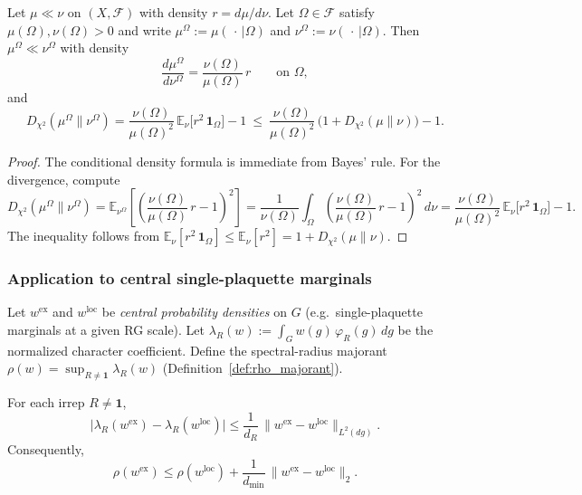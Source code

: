 \begin{lemma}\label{lem:chi2_conditioning}
Let $\mu\ll\nu$ on $(X,\mathcal F)$ with density $r=d\mu/d\nu$.
Let $\Omega\in\mathcal F$ satisfy $\mu(\Omega),\nu(\Omega)>0$ and write $\mu^{\Omega}:=\mu(\,\cdot\,|\Omega)$ and $\nu^{\Omega}:=\nu(\,\cdot\,|\Omega)$.
Then $\mu^{\Omega}\ll\nu^{\Omega}$ with density
\[
\frac{d\mu^{\Omega}}{d\nu^{\Omega}}
=
\frac{\nu(\Omega)}{\mu(\Omega)}\,r
\qquad\text{on }\Omega,
\]
and
\begin{equation}\label{eq:chi2_conditioning}
D_{\chi^2}(\mu^{\Omega}\|\nu^{\Omega})
=
\frac{\nu(\Omega)}{\mu(\Omega)^2}\,\mathbb E_{\nu}\!\big[r^2\,\mathbf 1_{\Omega}\big]-1
\ \le\
\frac{\nu(\Omega)}{\mu(\Omega)^2}\,\bigl(1+D_{\chi^2}(\mu\|\nu)\bigr)-1.
\end{equation}
\end{lemma}

\begin{proof}
The conditional density formula is immediate from Bayes' rule.
For the divergence, compute
\[
D_{\chi^2}(\mu^{\Omega}\|\nu^{\Omega})
=
\mathbb E_{\nu^{\Omega}}\!\left[\left(\frac{\nu(\Omega)}{\mu(\Omega)}\,r-1\right)^2\right]
=
\frac{1}{\nu(\Omega)}\int_{\Omega}\left(\frac{\nu(\Omega)}{\mu(\Omega)}\,r-1\right)^2\,d\nu
=
\frac{\nu(\Omega)}{\mu(\Omega)^2}\,\mathbb E_{\nu}\!\big[r^2\,\mathbf 1_{\Omega}\big]-1.
\]
The inequality follows from $\mathbb E_{\nu}[r^2\,\mathbf 1_{\Omega}]\le \mathbb E_{\nu}[r^2]=1+D_{\chi^2}(\mu\|\nu)$.
\end{proof}



\subsubsection{Application to central single-plaquette marginals}

Let $w^{\mathrm{ex}}$ and $w^{\mathrm{loc}}$ be \emph{central probability densities} on $G$
(e.g.\ single-plaquette marginals at a given RG scale).
Let $\lambda_R(w):=\int_G w(g)\,\varphi_R(g)\,dg$ be the normalized character coefficient.
Define the spectral-radius majorant $\rho(w)=\sup_{R\neq \mathbf 1}\lambda_R(w)$ (Definition~\ref{def:rho_majorant}).

\begin{lemma}\label{lem:coeff_transfer_L2}
For each irrep $R\neq\mathbf 1$,
\begin{equation}\label{eq:coeff_transfer_L2}
\bigl|\lambda_R(w^{\mathrm{ex}})-\lambda_R(w^{\mathrm{loc}})\bigr|
\le
\frac{1}{d_R}\,\|w^{\mathrm{ex}}-w^{\mathrm{loc}}\|_{L^2(dg)}.
\end{equation}
Consequently,
\begin{equation}\label{eq:rho_transfer_L2}
\rho(w^{\mathrm{ex}})
\le
\rho(w^{\mathrm{loc}})
+
\frac{1}{d_{\min}}\,\|w^{\mathrm{ex}}-w^{\mathrm{loc}}\|_{2}.
\end{equation}
\end{lemma}


